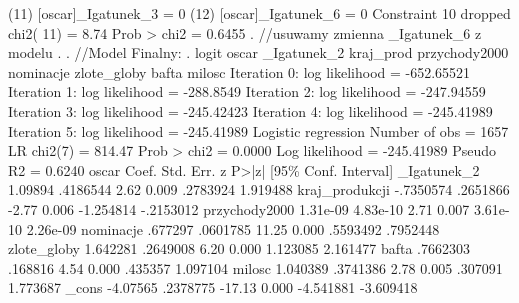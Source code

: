 \begin{stlog}
 (11)  [oscar]_Igatunek_3 = 0
 (12)  [oscar]_Igatunek_6 = 0
       Constraint 10 dropped
{\smallskip}
           chi2( 11) =    8.74
         Prob > chi2 =    0.6455
{\smallskip}
. //usuwamy zmienna _Igatunek_6 z modelu
. 
. //Model Finalny:
. logit oscar _Igatunek_2 kraj_prod przychody2000 nominacje zlote_globy bafta milosc
{\smallskip}
Iteration 0:   log likelihood = -652.65521  
Iteration 1:   log likelihood =  -288.8549  
Iteration 2:   log likelihood = -247.94559  
Iteration 3:   log likelihood = -245.42423  
Iteration 4:   log likelihood = -245.41989  
Iteration 5:   log likelihood = -245.41989  
{\smallskip}
Logistic regression                               Number of obs   =       1657
                                                  LR chi2(7)      =     814.47
                                                  Prob > chi2     =     0.0000
Log likelihood = -245.41989                       Pseudo R2       =     0.6240
{\smallskip}
         oscar {\VBAR}      Coef.   Std. Err.      z    P>|z|     [95\% Conf. Interval]
   _Igatunek_2 {\VBAR}    1.09894   .4186544     2.62   0.009     .2783924    1.919488
kraj_produkcji {\VBAR}  -.7350574   .2651866    -2.77   0.006    -1.254814   -.2153012
 przychody2000 {\VBAR}   1.31e-09   4.83e-10     2.71   0.007     3.61e-10    2.26e-09
     nominacje {\VBAR}    .677297   .0601785    11.25   0.000     .5593492    .7952448
   zlote_globy {\VBAR}   1.642281   .2649008     6.20   0.000     1.123085    2.161477
         bafta {\VBAR}   .7662303    .168816     4.54   0.000      .435357    1.097104
        milosc {\VBAR}   1.040389   .3741386     2.78   0.005      .307091    1.773687
         _cons {\VBAR}   -4.07565   .2378775   -17.13   0.000    -4.541881   -3.609418
{\smallskip}


\end{stlog}
